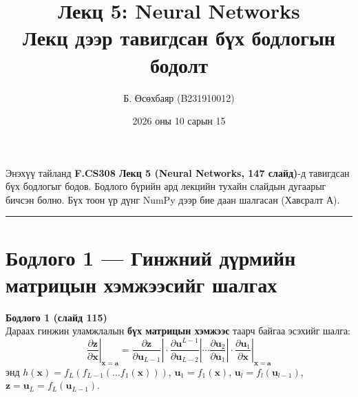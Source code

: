 \documentclass[11pt]{article}
\title{\textbf{Лекц 5: Neural Networks} \\[4pt]
       \large Лекц дээр тавигдсан бүх бодлогын бодолт}
\author{Б. Өсөхбаяр \quad (B231910012)}
\date{2026 оны 10 сарын 15}
\newenvironment{problem}[2][Бодлого]
    { \begin{mdframed}[backgroundcolor=gray!20] \textbf{#1 #2} \\}
    { \end{mdframed}}
\begin{document}
\maketitle

\noindent
Энэхүү тайланд \textbf{F.CS308 Лекц 5 (Neural Networks, 147 слайд)}-д тавигдсан бүх
бодлогыг бодов. Бодлого бүрийн ард лекцийн тухайн слайдын дугаарыг бичсэн болно.
Бүх тоон үр дүнг NumPy дээр бие даан шалгасан (Хавсралт А).

\tableofcontents
\bigskip
\hrule

\section{Бодлого 1 — Гинжний дүрмийн матрицын хэмжээсийг шалгах}

\begin{problem}{1 (слайд 115)}
Дараах гинжин уламжлалын \textbf{бүх матрицын хэмжээс} таарч байгаа эсэхийг шалга:
\[
\left.\frac{\partial \mathbf{z}}{\partial \mathbf{x}}\right|_{\mathbf{x}=\mathbf{a}}
= \left.\frac{\partial \mathbf{z}}{\partial \mathbf{u}_{L-1}}\right|
\cdot \left.\frac{\partial \mathbf{u}^{L-1}}{\partial \mathbf{u}_{L-2}}\right|
\cdots
\left.\frac{\partial \mathbf{u}_{2}}{\partial \mathbf{u}_{1}}\right|
\cdot \left.\frac{\partial \mathbf{u}_{1}}{\partial \mathbf{x}}\right|_{\mathbf{x}=\mathbf{a}}
\]
энд $h(\mathbf{x}) = f_L(f_{L-1}(\dots f_1(\mathbf{x})))$,
$\mathbf{u}_1 = f_1(\mathbf{x})$, $\mathbf{u}_l = f_l(\mathbf{u}_{l-1})$,
$\mathbf{z} = \mathbf{u}_L = f_L(\mathbf{u}_{L-1})$.
\end{problem}
\end{document}
